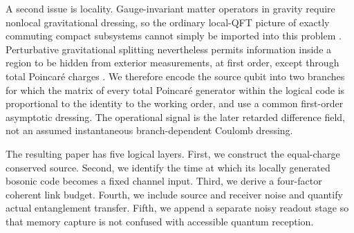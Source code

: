 

A second issue is locality. Gauge-invariant matter operators in gravity require nonlocal gravitational dressing, so the ordinary local-QFT picture of exactly commuting compact subsystems cannot simply be imported into this problem \cite{DonnellyGiddings2016}. Perturbative gravitational splitting nevertheless permits information inside a region to be hidden from exterior measurements, at first order, except through total Poincar\'e charges \cite{DonnellyGiddings2018}. We therefore encode the source qubit into two branches for which the matrix of every total Poincar\'e generator within the logical code is proportional to the identity to the working order, and use a common first-order asymptotic dressing. The operational signal is the later retarded difference field, not an assumed instantaneous branch-dependent Coulomb dressing.

The resulting paper has five logical layers. First, we construct the equal-charge conserved source. Second, we identify the time at which its locally generated bosonic code becomes a fixed channel input. Third, we derive a four-factor coherent link budget. Fourth, we include source and receiver noise and quantify actual entanglement transfer. Fifth, we append a separate noisy readout stage so that memory capture is not confused with accessible quantum reception.
